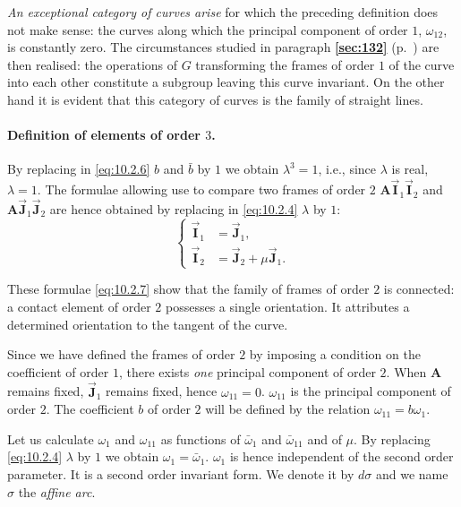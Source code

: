 \documentclass[leqno,11pt]{book}
\numberwithin{equation}{chapter}
\theoremstyle{shape1}
\theoremstyle{shapesmall}
\newcommand{\fsref}[1]{{\rm\textsection\textbf{\ref{sec:#1}}}}
\newcommand{\rvec}[1]{\vec{\mathbf{#1}}}
\newcommand{\ivec}{\rvec{I}}
\newcommand{\jvec}{\rvec{J}}
\begin{document}
\emph{An exceptional category of curves arise} for which the preceding definition does not make sense: the curves along which the principal component of order $1$, $\omega_{12}$, is constantly zero. The circumstances studied in paragraph \fsref{132} (p.~\pageref{sec:132}) are then realised: the operations of $G$ transforming the frames of order $1$ of the curve into each other constitute a subgroup leaving this curve invariant. On the other hand it is evident that this category of curves is the family of straight lines.

\paragraph{Definition of elements of order $3$.}
\label{sec:136}
By replacing in \eqref{eq:10.2.6} $b$ and $\bar b$ by $1$ we obtain $\lambda^{3}=1$, i.e., since $\lambda$ is real, $\lambda=1$. The formulae allowing use to compare two frames of order $2$ $\mathbf{A}\ivec_{1}\ivec_{2}$ and $\mathbf{A}\jvec_{1}\jvec_{2}$ are hence obtained by replacing in \eqref{eq:10.2.4} $\lambda$ by $1$:
\begin{equation}
  \label{eq:10.2.7}
  \left\{
    \begin{aligned}
      \ivec_{1}&=\jvec_{1},\\
      \ivec_{2}&=\jvec_{2}+\mu\jvec_{1}.
    \end{aligned}
  \right.
\end{equation}

These formulae \eqref{eq:10.2.7} show that the family of frames of order $2$ is connected: a contact element of order $2$ possesses a single orientation. It attributes a determined orientation to the tangent of the curve.

Since we have defined the frames of order $2$ by imposing a condition on the coefficient of order $1$, there exists \emph{one} principal component of order $2$. When $\mathbf{A}$ remains fixed, $\jvec_{1}$ remains fixed, hence $\omega_{11}=0$. $\omega_{11}$ is the principal component of order $2$. The coefficient $b$ of order $2$ will be defined by the relation $\omega_{11}=b\omega_{1}$.

Let us calculate $\omega_{1}$ and $\omega_{11}$ as functions of $\bar\omega_{1}$ and $\bar\omega_{11}$ and of $\mu$. By replacing \eqref{eq:10.2.4} $\lambda$ by $1$ we obtain $\omega_{1}=\bar\omega_{1}$. $\omega_{1}$ is hence independent of the second order parameter. It is a second order invariant form. We denote it by $d\sigma$ and we name $\sigma$ the \emph{affine arc}.
\end{document}
